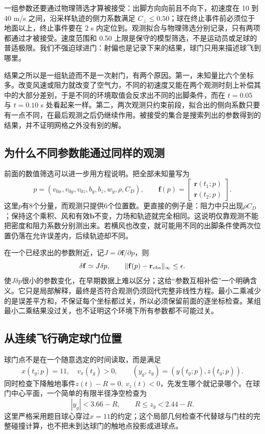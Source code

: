 \documentclass[11pt,a4paper,UTF8,fontset=windows]{ctexart}
\begin{document}
一组参数还要通过物理筛选才算被接受：出脚方向向前且不向下，初速度在 10 到 40 m/s 之间，沿采样轨迹的侧力系数满足 $C_\perp\le0.50$；球在终止事件前必须位于地面以上，终止事件要在 2 s 内定位到。观测拟合与物理筛选分别记录，只有两项都通过才被接受。速度范围和 0.50 上限是保守的模型筛选，不是运动员或足球的普适极限。我们不强迫球进门：射偏也是记录下来的结果，球门只用来描述球飞到哪里。

结果之所以是一组轨迹而不是一次射门，有两个原因。第一，未知量比六个坐标多。改变风速或阻力就改变了空气力，不同的初速度又能在两个观测时刻上补偿其中的大部分差别，于是不同的环境取值会反求出不同的出脚条件，而在 $t=0.05$ 与 $t=0.10$ s 处看起来一样。第二，两次观测只约束前段，拟合出的侧向系数只要有一点不同，在最后观测之后仍继续作用。被接受的集合是搜索列出的参数得到的结果，并不证明网格之外没有别的解。


\subsection{为什么不同参数能通过同样的观测}
前面的数值筛选可以进一步用方程说明。把全部未知量写为
\begin{equation}
p=(v_{0x},v_{0y},v_{0z},b_y,b_z,w_y,\rho,C_D),\qquad
\mathbf f(p)=\begin{bmatrix}\mathbf r(t_1;p)\\\mathbf r(t_2;p)\end{bmatrix}.
\end{equation}
这里$p$有8个分量，而观测只提供6个位置数。更直接的例子是：阻力中只出现$\rho C_D$；保持这个乘积、风和有效$\mathbf b$不变，力场和轨迹就完全相同。这说明仅靠观测不能把密度和阻力系数分别测出来。若横风也改变，就可能用不同的出脚条件使两次位置仍落在允许误差内，后续轨迹却不同。

在一个已经求出的参数附近，记$J=\partial\mathbf f/\partial p$，则
\begin{equation}
\delta\mathbf f\simeq J\delta p,\qquad
\|\mathbf f(p)-\mathbf r_{\rm obs}\|_\infty\le\epsilon.
\end{equation}
使$J\delta p$很小的参数变化，在早期数据上难以区分；这给“参数互相补偿”一个明确含义。它只是局部解释，最终是否符合观测仍须回代完整非线性方程。最小二乘减少的是误差平方和，不保证每个坐标都过关，所以必须保留前面的逐坐标检查。某组最小二乘结果没过关，也不证明这个环境下所有参数都不可能过关。
\subsection{从连续飞行确定球门位置}
球门点不是在一个随意选定的时间读取，而是满足
\begin{equation}
x(t_g;p)=11,\quad v_x(t_g)>0,\qquad
(y_g,z_g)=(y(t_g;p),z(t_g;p)).
\label{eq:goal}
\end{equation}
同时检查下降触地事件$z(t)-R=0,\ v_z(t)<0$，先发生哪个就记录哪个。在球门中心平面，一个简单的有限半径净空检查为
\begin{equation}
|y_g|<3.66-R,\qquad R\le z_g<2.44-R.
\end{equation}
这里严格采用题目球心穿过$x=11$的约定；这个局部几何检查不代替球与门柱的完整碰撞计算，也不把未到达球门的触地点投影成进球点。
\end{document}
